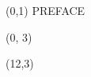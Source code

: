 \documentclass[10pt]{article}
\begin{document}
\begin{textblock}{23}(0,1)
\center\huge PREFACE
\end{textblock}

\begin{textblock}{11}(0, 3)
    {}
    {}
\end{textblock}

\begin{textblock}{11}(12,3)
    {}
    {}
\end{textblock}
\end{document}
